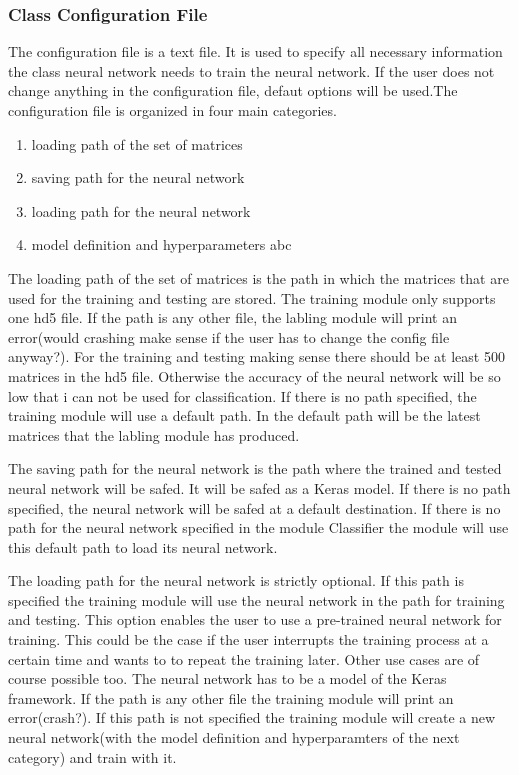 \documentclass[parskip=full]{scrartcl}
\begin{document}
\subsubsection{Class Configuration File}
The configuration file is a text file.
It is used to specify all necessary information the class neural network needs to train the neural network.
If the user does not change anything in the configuration file, defaut options will be used.The configuration file is organized in four main categories. 
\begin{enumerate}
\item loading path of the set of matrices 
\item saving path for the neural network
\item loading path for the neural network
\item model definition and hyperparameters abc
\end{enumerate}
The loading path of the set of matrices is the path in which the matrices that are used for the training and testing are stored.
The training module only supports one hd5 file.
If the path is any other file, the labling module will print an error(would crashing make sense if the user has to change the config file anyway?).
For the training and testing making sense there should be at least 500 matrices in the hd5 file.
Otherwise the accuracy of the neural network will be so low that i can not be used for classification.
If there is no path specified, the training module will use a default path.
In the default path will be the latest matrices that the labling module has produced. \newline

The saving path for the neural network is the path where the trained and tested neural network will be safed.
It will be safed as a Keras model.
If there is no path specified, the neural network will be safed at a default destination.
If there is no path for the neural network specified in the module Classifier the module will use this default path to load its neural network.\newline

The loading path for the neural network is strictly optional.
If this path is specified the training module will use the neural network in the path for training and testing.
This option enables the user to use a pre-trained neural network for training.
This could be the case if the user interrupts the training process at a certain time and wants to to repeat the training later.
Other use cases are of course possible too.
The neural network has to be a model of the Keras framework. If the path is any other file the training module will print an error(crash?).
If this path is not specified the training module will create a new neural network(with the model definition and hyperparamters of the next category) and train with it. \newline
\end{document}
